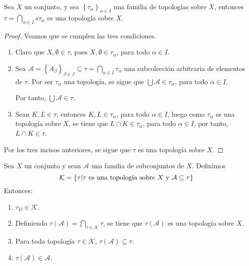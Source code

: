 \documentclass[12pt]{report}
\theoremstyle{largebreak}
\begin{document}
    \begin{theor}
        Sea $X$ un conjunto, y sea $\left\{\tau_\alpha\right\}_{\alpha\in I}$ una familia de topologías sobre $X$, entonces $\tau=\bigcap_{\alpha\in I}s\tau_\alpha$ es una topología sobre $X$.
    \end{theor}

    \begin{proof}
        Veamos que se cumplen las tres condiciones.
        \begin{enumerate}
            \item Claro que $X,\emptyset\in\tau$, pues $X,\emptyset\in\tau_\alpha$, para todo $\alpha\in I$.
            \item Sea $\mathcal{A}=\left\{A_\beta\right\}_{\beta\in J}\subseteq\tau=\bigcap_{\alpha\in I}\tau_\alpha$ una subcolección arbitraria de elementos de $\tau$. Por ser $\tau_\alpha$ una topología, se sigue que $\bigcup\mathcal{A}\in\tau_\alpha$, para todo $\alpha\in I$.

            Por tanto, $\bigcup\mathcal{A}\in\tau$.
            \item Sean $K,L\in\tau$, entonces $K,L\in\tau_\alpha$, para todo $\alpha\in I$, luego como $\tau_\alpha$ es una topología sobre $X$, se tiene que $L\cap K\in \tau_\alpha$, para todo $\alpha\in I$, por tanto, $L\cap K\in\tau$.
        \end{enumerate}
        Por los tres incisos anteriores, se sigue que $\tau$ es una topología sobre $X$.
    \end{proof}

    \begin{cor}
        Sea $X$ un conjunto y sean $\mathcal{A}$ una familia de subconjuntos de $X$. Definimos
        \begin{equation*}
            \mathcal{K}=\left\{\tau|\tau\textup{ es una topología sobre }X\textup{ y }\mathcal{A}\subseteq\tau \right\}
        \end{equation*}
        Entonces:
        \begin{enumerate}
            \item $\tau_D\in\mathcal{K}$.
            \item Definiendo $\tau(\mathcal{A})=\bigcap_{\tau\in\mathcal{K}}\tau$, se tiene que $\tau(\mathcal{A})$ es una topología sobre $X$.
            \item Para toda topología $\tau\in\mathcal{K}$, $\tau(\mathcal{A})\subseteq\tau$.
            \item $\tau(\mathcal{A})\in\mathcal{A}$.
        \end{enumerate}
    \end{cor}
\end{document}
